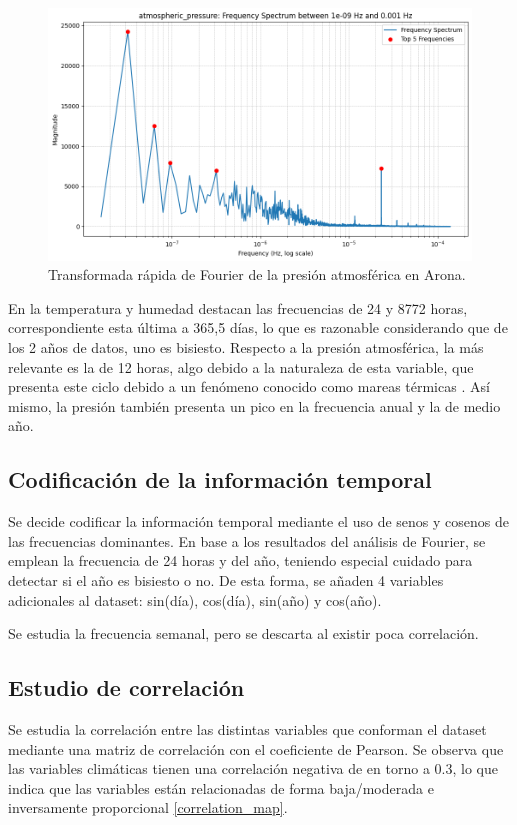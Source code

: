  \begin{figure}
    \centering
    \includegraphics[width=.5\linewidth]{images/fft_pressure.png}
    \caption{Transformada rápida de Fourier de la presión atmosférica en Arona.}
    \label{fft_pressure}
\end{figure}



En la temperatura y humedad destacan las frecuencias de 24 y 8772 horas, correspondiente esta última a 365,5 días, lo que es razonable considerando que de los 
2 años de datos, uno es bisiesto. Respecto a la presión atmosférica, la más relevante es la de 12 horas, algo debido a la naturaleza de esta variable, 
que presenta este ciclo debido a un fenómeno conocido como mareas térmicas \cite{ChapmanLindzen1970}. Así mismo, la presión también presenta un pico en la frecuencia anual y la de medio año.


\subsection{Codificación de la información temporal}
Se decide codificar la información temporal mediante el uso de senos y cosenos de las frecuencias dominantes.
En base a los resultados del análisis de Fourier, se emplean la frecuencia de 24 horas y del año, teniendo especial cuidado para detectar
    si el año es bisiesto o no. De esta forma, se añaden 4 variables adicionales al dataset: sin(día), cos(día), sin(año) y cos(año).

Se estudia la frecuencia semanal, pero se descarta al existir poca correlación.

\subsection{Estudio de correlación}
Se estudia la correlación entre las distintas variables que conforman el dataset mediante una matriz de correlación con el coeficiente de Pearson.
Se observa que las variables climáticas tienen una correlación negativa de en torno a 0.3, lo que indica que las variables están relacionadas de 
forma baja/moderada e inversamente proporcional \ref{correlation_map}.

